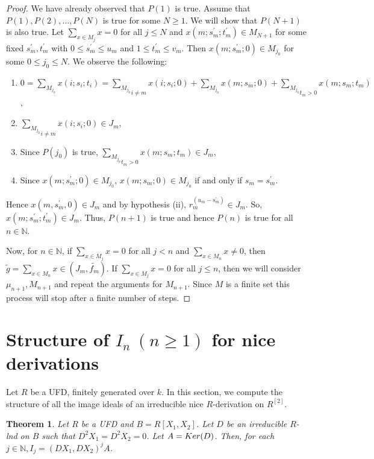 \documentclass[a4paper,12pt]{article}
\newtheorem{thm}{Theorem}[section]
\newcommand{\bN}{\mathbb N}
\begin{document}
{\begin{proof}
\noindent
We have already observed that $P(1)$ is true. Assume that $P(1),P(2),\dots,P(N)$ is true for some $N\geqslant 1$. We will show that $P(N+1)$ is also true. Let ${\underset{x\in M_j}\sum}x=0$ for all $j\leqslant N$ and $x(m;s_m^{'};t_m^{'})\in M_{N+1}$ for some fixed $s_m^{'},t_m^{'}$ with $0\leqslant s_m^{'}\leqslant u_m$ and $1\leqslant t_m^{'}\leqslant v_m$. Then $x(m;s_m^{'};0)\in M_{j_0}$ for some $0\leqslant j_0\leqslant N$. We observe the following:
\begin{enumerate}
	\item $0={\underset{M_{j_0}}\sum}x(i;s_i;t_i)={\underset{i\neq m}{\underset{M_{j_0}}\sum}}x(i;s_i;0)+{\underset{M_{j_0}}\sum}x(m;s_m;0)+{\underset{t_m>0}{\underset{M_{j_0}}\sum}}x(m;s_m;t_m)$,
	\item ${\underset{i\neq m}{\underset{M_{j_0}}\sum}}x(i;s_i;0)\in J_m$,
	\item Since $P(j_0)$ is true, ${\underset{t_m> 0}{\underset{M_{j_0}}\sum}}x(m;s_m;t_m)\in J_m$,
	\item Since $x(m;s_m^{'};0)\in M_{j_0}$, $x(m;s_m;0)\in M_{j_0}$ if and only if $s_m=s_m^{'}$.
\end{enumerate}
\medskip\noindent 
Hence $x(m,s_m^{'},0)\in J_m$ and  by hypothesis (ii), $r_m^{(u_m-s_m^{'})}\in J_m$. So, $x(m;s_m^{'};t_m^{'})\in J_m$. Thus, $P(n+1)$ is true and hence $P(n)$ is true for all $n\in\bN$.

\medskip\noindent
Now, for $n\in\bN$, if ${\underset{x\in M_j}\sum}x= 0$ for all $j<n$ and ${\underset{x\in M_n}\sum}x\neq 0$, then $\widetilde{g}={\underset{x\in M_n}\sum}x\in(J_m,\widetilde{f_m})$. If ${\underset{x\in M_j}\sum}x=0$ for all $j\leqslant n$, then we will consider $\mu_{n+1},M_{n+1}$ and repeat the arguments for $M_{n+1}$. Since $M$ is a finite set this process will stop after a finite number of steps.
\end{proof}

\section{Structure of $I_n~(n\geqslant 1)$ for nice derivations}
Let $R$ be a UFD, finitely generated over $k$. In this section, we compute the structure of all the image ideals of an irreducible nice $R$-derivation on $R^{[2]}$.
\begin{thm}\label{inice}
Let $R$ be a {\rm UFD} and $B=R[X_1,X_2]$. Let $D$ be an irreducible $R$-lnd on $B$ such that $D^2X_1=D^2X_2=0$. Let $A={\rm Ker}(D)$. Then, for each $j\in \bN, I_j ={( DX_1,DX_2)}^jA$.
\end{thm}

}
\end{document}
